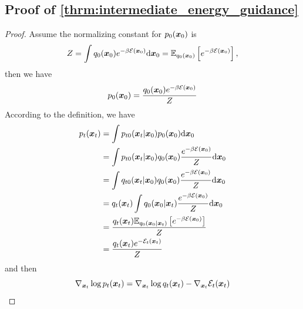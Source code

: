 \subsection{Proof of \cref{thrm:intermediate_energy_guidance}}
\begin{proof}
Assume the normalizing constant for $p_0({\bm{x}}_0)$ is
\begin{equation*}
    Z = \int q_0({\bm{x}}_0) e^{-\beta{\mathcal{E}}({\bm{x}}_0)}\mathrm{d}{\bm{x}}_0 = \mathbb{E}_{q_0({\bm{x}}_0)}\left[e^{-\beta{\mathcal{E}}({\bm{x}}_0)}\right],
\end{equation*}
then we have
\begin{equation*}
    p_0({\bm{x}}_0) = \frac{q_0({\bm{x}}_0)e^{-\beta{\mathcal{E}}({\bm{x}}_0)}}{Z}
\end{equation*}
According to the definition, we have
\begin{equation*}
\begin{split}
p_t({\bm{x}}_t) &= \int p_{t0}({\bm{x}}_t|{\bm{x}}_0)p_0({\bm{x}}_0)\mathrm{d}{\bm{x}}_0 \\
    &= \int p_{t0}({\bm{x}}_t|{\bm{x}}_0)q_0({\bm{x}}_0)\frac{e^{-\beta{\mathcal{E}}({\bm{x}}_0)}}{Z}\mathrm{d}{\bm{x}}_0 \\
    &= \int q_{t0}({\bm{x}}_t|{\bm{x}}_0)q_0({\bm{x}}_0)\frac{e^{-\beta{\mathcal{E}}({\bm{x}}_0)}}{Z}\mathrm{d}{\bm{x}}_0 \\
    &= q_t({\bm{x}}_t)\int q_{0}({\bm{x}}_0|{\bm{x}}_t)\frac{e^{-\beta{\mathcal{E}}({\bm{x}}_0)}}{Z}\mathrm{d}{\bm{x}}_0 \\
    &= \frac{q_t({\bm{x}}_t)\mathbb{E}_{q_{0}({\bm{x}}_0|{\bm{x}}_t)}\left[e^{-\beta{\mathcal{E}}({\bm{x}}_0)}\right]}{Z} \\
    &= \frac{q_t({\bm{x}}_t)e^{-{\mathcal{E}}_t({\bm{x}}_t)}}{Z}
\end{split}
\end{equation*}
and then
\begin{equation*}
    \nabla_{{\bm{x}}_t}\log p_t({\bm{x}}_t) = \nabla_{{\bm{x}}_t}\log q_t({\bm{x}}_t) - \nabla_{{\bm{x}}_t}{\mathcal{E}}_t({\bm{x}}_t) 
\end{equation*}

\end{proof}


